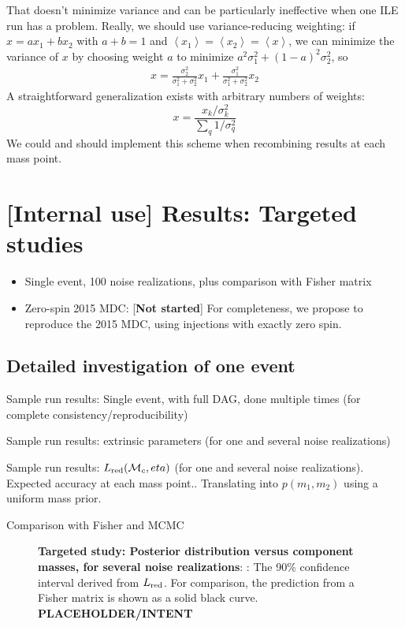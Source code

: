\documentclass[twocolumn,prd,nofootinbib]{revtex4}
\newcommand\mc{{{\cal M}_c}}
\begin{document}
{That doesn't minimize variance and can be particularly
ineffective when one ILE run has a problem.  Really, we should use variance-reducing weighting: if $x=ax_1 +b x_2$ with $a+b=1$ and
$\left<x_1\right> =\left<x_2\right> =\left<x\right>$, we can minimize the variance of $x$ by choosing weight $a$ to
minimize $a^2 \sigma_1^2 + (1-a)^2 \sigma_2^2$, so 
\begin{eqnarray}
x = \frac{\sigma_2^2}{\sigma_1^2+\sigma_2^2} x_1 +  \frac{\sigma_1^2}{\sigma_1^2+\sigma_2^2} x_2
\end{eqnarray}
A straightforward generalization exists with arbitrary numbers of weights:
\[
x = \frac{x_k/\sigma_k^2}{\sum_q 1/\sigma_q^2}
\]
We could and should implement this scheme when recombining results at each mass point. 

\section{[Internal use] Results: Targeted studies}

\begin{itemize}
\item Single event, 100 noise realizations, plus comparison with Fisher matrix

\item Zero-spin 2015 MDC: [\textbf{Not started}]  For completeness, we propose to reproduce the 2015 MDC,  using
  injections with exactly zero spin.

\end{itemize}

\subsection{Detailed investigation of one event}
Sample run results: Single event, with full DAG, done multiple times (for complete consistency/reproducibility)

Sample run results: extrinsic parameters (for one and several noise realizations)

Sample run results: $L_{\rm red}(\mc,eta)$ (for one and several noise realizations). Expected accuracy at each mass
point.. Translating into  $p(m_1,m_2)$ using a uniform mass prior.

Comparison with Fisher and MCMC


\begin{figure}
\caption{\label{fig:TargetedEvent:LikelihoodVersusMchirpEta}\textbf{Targeted study: Posterior distribution
    versus component masses, for several noise realizations}: : The 90\% confidence interval derived from $L_{\rm red}$.  For
comparison, the prediction from a Fisher matrix is shown as a solid black curve.
 \textbf{PLACEHOLDER/INTENT}
}
\end{figure}


}
\end{document}
